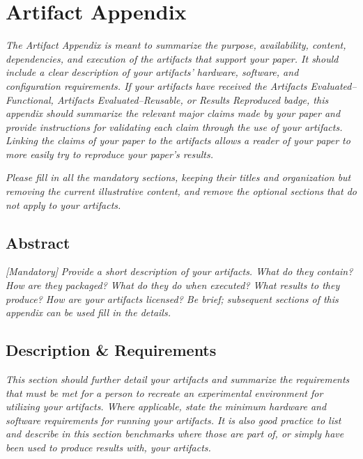 \section{Artifact Appendix}

\emph{The Artifact Appendix is meant to summarize the purpose,
availability, content, dependencies, and execution of the artifacts
that support your paper.  It should include a clear description of
your artifacts' hardware, software, and configuration requirements.
If your artifacts have received the \emph{Artifacts
Evaluated--Functional}, \emph{Artifacts Evaluated--Reusable}, or
\emph{Results Reproduced} badge, this appendix should summarize the
relevant major claims made by your paper and provide instructions for
validating each claim through the use of your artifacts.  Linking the
claims of your paper to the artifacts allows a reader of your paper
to more easily try to reproduce your paper's results.}

\emph{Please fill in all the mandatory sections, keeping their titles
and organization but removing the current illustrative content, and
remove the optional sections that do not apply to your artifacts.}


\subsection{Abstract}

\emph{[Mandatory]}
%
\emph{Provide a short description of your artifacts.  What do they
contain?  How are they packaged?  What do they do when executed?  What
results to they produce?  How are your artifacts licensed?  Be brief;
subsequent sections of this appendix can be used fill in the details.}


\subsection{Description \& Requirements}

\emph{This section should further detail your artifacts and summarize
the requirements that must be met for a person to recreate an
experimental environment for utilizing your artifacts.  Where
applicable, state the minimum hardware and software requirements for
running your artifacts.  It is also good practice to list and describe
in this section benchmarks where those are part of, or simply have
been used to produce results with, your artifacts.}

